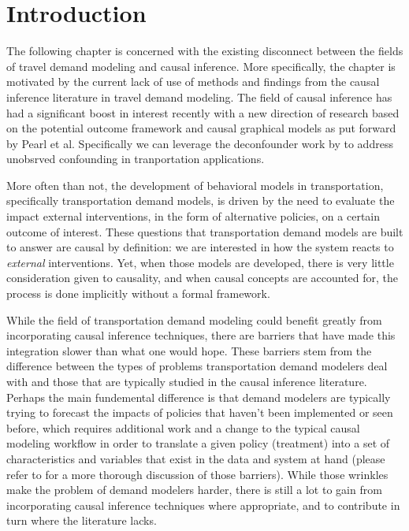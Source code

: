\section{Introduction}
The following chapter is concerned with the existing disconnect between the 
fields of travel demand modeling and causal inference. More specifically, the 
chapter is motivated by the current lack of use of methods and findings from 
the causal inference literature in travel demand modeling. The field of causal 
inference has had a significant boost in interest recently with a new 
direction of research based on the potential outcome framework and causal 
graphical models as put forward by Pearl et al. Specifically we can leverage 
the deconfounder work by \citet{wang_2019_blessings} to address unobsrved confounding in 
tranportation applications.

More often than not, the development of behavioral models in transportation, 
specifically transportation demand models, is driven by the need to evaluate 
the impact external interventions, in the form of alternative policies, on a 
certain outcome of interest. These questions that transportation demand models 
are built to answer are causal by definition: we are interested in how the 
system reacts to \textit{external} interventions. Yet, when those models are 
developed, there is very little consideration given to causality, and when 
causal concepts are accounted for, the process is done implicitly without a 
formal framework. 

While the field of transportation demand modeling could benefit greatly from 
incorporating causal inference techniques, there are barriers that have made 
this integration slower than what one would hope. These barriers stem from 
the difference between the types of problems transportation demand modelers deal with and those that are typically studied in the causal inference literature. Perhaps the main fundemental difference is that demand modelers 
are typically trying to forecast the impacts of policies that haven't been 
implemented or seen before, which requires additional work and a change to the
typical causal modeling workflow in order to translate a given policy 
(treatment) into a set of characteristics and variables that exist in the
data and system at hand (please refer to \citet{brathwaite_2018_causal} for a 
more thorough discussion of those barriers). While those wrinkles make the
problem of demand modelers harder, there is still a lot to gain from 
incorporating causal inference techniques where appropriate, and to contribute
in turn where the literature lacks.  


